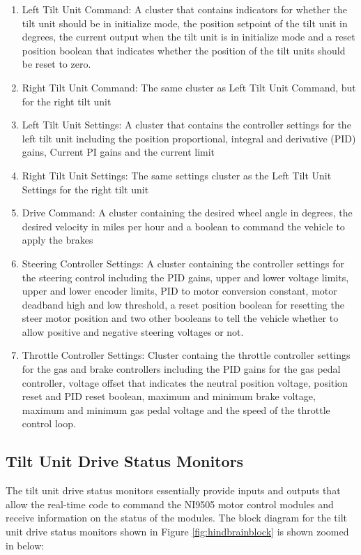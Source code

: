 \begin{enumerate}
\item Left Tilt Unit Command: A cluster that contains indicators for whether the tilt unit should be in initialize mode, the position setpoint of the tilt unit in degrees, the current output when the tilt unit is in initialize mode and a reset position boolean that indicates whether the position of the tilt units should be reset to zero.
\item Right Tilt Unit Command: The same cluster as Left Tilt Unit Command, but for the right tilt unit
\item Left Tilt Unit Settings: A cluster that contains the controller settings for the left tilt unit including the position proportional, integral and derivative (PID) gains, Current PI gains and the current limit
\item Right Tilt Unit Settings: The same settings cluster as the Left Tilt Unit Settings for the right tilt unit
\item Drive Command: A cluster containing the desired wheel angle in degrees, the desired velocity in miles per hour and a boolean to command the vehicle to apply the brakes
\item Steering Controller Settings: A cluster containing the controller settings for the steering control including the PID gains, upper and lower voltage limits, upper and lower encoder limits, PID to motor conversion constant, motor deadband high and low threshold, a reset position boolean for resetting the steer motor position and two other booleans to tell the vehicle whether to allow positive and negative steering voltages or not.
\item Throttle Controller Settings: Cluster containg the throttle controller settings for the gas and brake controllers including the PID gains for the gas pedal controller, voltage offset that indicates the neutral position voltage, position reset and PID reset boolean, maximum and minimum brake voltage, maximum and minimum gas pedal voltage and the speed of the throttle control loop. 
\end{enumerate}

\subsection{Tilt Unit Drive Status Monitors}
The tilt unit drive status monitors essentially provide inputs and outputs that allow the real-time code to command the NI9505 motor control modules and receive information on the status of the modules. The block diagram for the tilt unit drive status monitors shown in Figure \ref{fig:hindbrainblock} is shown zoomed in below:

